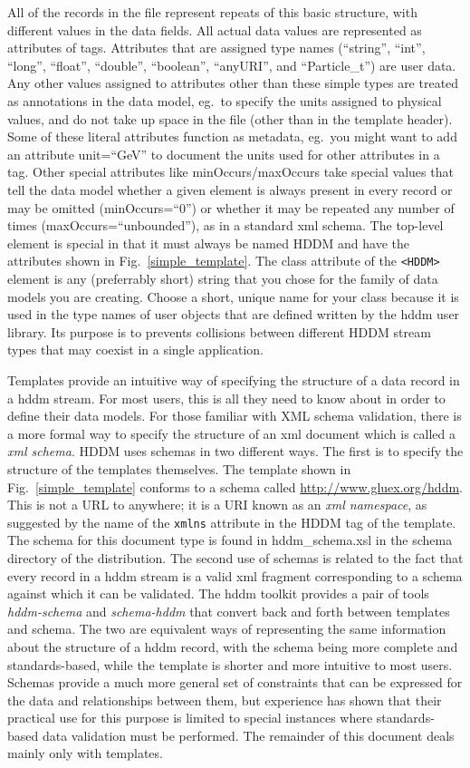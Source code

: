 \documentclass{revtex4}
\begin{document}
All of the records in the file represent repeats of this basic structure, with 
different values in the data fields. All actual data values are represented as
attributes of tags. Attributes that are assigned type names (``string'', ``int'',
``long'', ``float'', ``double'', ``boolean'', ``anyURI'', and ``Particle\_t'')
are user data. Any other values assigned to attributes other than these simple
types are treated as annotations in the data model, eg.\ to specify the units
assigned to physical values, and do not take up space in the file (other than
in the template header). Some of these literal attributes function as metadata,
eg.\ you might want to add an attribute unit=``GeV'' to document the units used
for other attributes in a tag. Other special attributes like minOccurs/maxOccurs
take special values that tell the data model whether a given element is always
present in every record or may be omitted (minOccurs=``0'') or whether it may
be repeated any number of times (maxOccurs=``unbounded''), as in a standard
xml schema. The top-{}level element is special in that it must always be named
HDDM and have the attributes shown in Fig.~\ref{simple_template}. The class
attribute of the \texttt{<HDDM>} element is any (preferrably short) string that
you chose for the family of data models you are creating. Choose a short, unique
name for your class because it is used in the type names of user objects that are
defined written by the hddm user library. Its purpose is to prevents collisions
between different HDDM stream types that may coexist in a single application.

Templates provide an intuitive way of specifying the structure of a data record
in a hddm stream. For most users, this is all they need to know about in order
to define their data models. For those familiar with XML schema validation,
there is a more formal way to specify the structure of an xml document which is
called a {\em xml schema}. HDDM uses schemas in two different ways. The first
is to specify the structure of the templates themselves. The template shown in
Fig.~\ref{simple_template} conforms to a schema called \url{http://www.gluex.org/hddm}.
This is not a URL to anywhere; it is a URI known as an {\em xml namespace}, as
suggested by the name of the \texttt{xmlns} attribute in the HDDM tag of the template.
The schema for this document type is found in hddm\_schema.xsl in the schema
directory of the distribution. The second use of schemas is related to the fact
that every record in a hddm stream is a valid xml fragment corresponding to a
schema against which it can be validated. The hddm toolkit provides a pair of
tools {\em hddm-{}schema} and {\em schema-{}hddm} that convert back and forth
between templates and schema. The two are equivalent ways of representing the
same information about the structure of a hddm record, with the schema being
more complete and standards-{}based, while the template is shorter and more 
intuitive to most users. Schemas provide a much more general set of constraints
that can be expressed for the data and relationships between them, but 
experience has shown that their practical use for this purpose is limited to
special instances where standards-based data validation must be performed.
The remainder of this document deals mainly only with templates.
\end{document}
